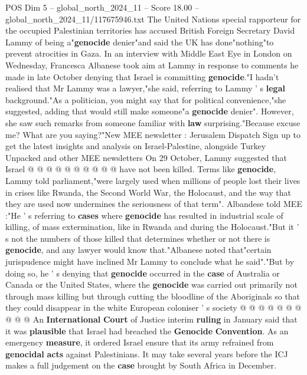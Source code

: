\begin{textsample}{POS Dim 5 – global\_north\_2024\_11 – Score 18.00 – global\_north\_2024\_11/117675946.txt}  \label{ex:f5_pos_037}
The United Nations special rapporteur for the occupied Palestinian territories has accused British Foreign Secretary David Lammy of being a"\textbf{genocide} denier"and said the UK has done"nothing"to prevent atrocities in Gaza.
In an interview with Middle East Eye in London on Wednesday, Francesca Albanese took aim at Lammy in response to comments he made in late October denying that Israel is committing \textbf{genocide}."I hadn't realised that Mr Lammy was a lawyer,"she said, referring to Lammy ' s \textbf{legal} background."As a politician, you might say that for political convenience,"she suggested, adding that would still make someone"a \textbf{genocide} denier".
However, she saw such remarks from someone familiar with \textbf{law} surprising."Because excuse me?
What are you saying?"New MEE newsletter : Jerusalem Dispatch Sign up to get the latest insights and analysis on Israel-Palestine, alongside Turkey Unpacked and other MEE newsletters On 29 October, Lammy suggested that Israel @ @ @ @ @ @ @ @ @ @ have not been killed.
Terms like \textbf{genocide}, Lammy told parliament,"were largely used when millions of people lost their lives in crises like Rwanda, the Second World War, the Holocaust, and the way that they are used now undermines the seriousness of that term".
Albandese told MEE :"He ' s referring to \textbf{cases} where \textbf{genocide} has resulted in industrial scale of killing, of mass extermination, like in Rwanda and during the Holocaust."But it ' s not the numbers of those killed that determines whether or not there is \textbf{genocide}, and any lawyer would know that."Albanese noted that"certain jurispudence might have inclined Mr Lammy to conclude what he said"."But by doing so, he ' s denying that \textbf{genocide} occurred in the \textbf{case} of Australia or Canada or the United States, where the \textbf{genocide} was carried out primarily not through mass killing but through cutting the bloodline of the Aboriginals so that they could disappear in the white European coloniser ' s society @ @ @ @ @ @ @ @ @ @ An \textbf{International} \textbf{Court} of Justice interim \textbf{ruling} in January said that it was \textbf{plausible} that Israel had breached the \textbf{Genocide} \textbf{Convention}.
As an emergency \textbf{measure}, it ordered Israel ensure that its army refrained from \textbf{genocidal} \textbf{acts} against Palestinians.
It may take several years before the ICJ makes a full judgement on the \textbf{case} brought by South Africa in December.

\end{textsample}
